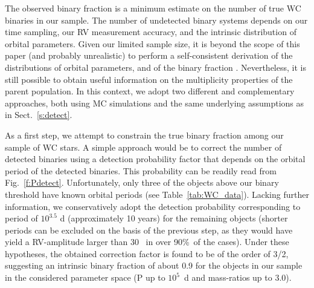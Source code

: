 The observed binary fraction is a minimum estimate on the number of true WC binaries in our sample. The number of undetected binary systems depends on our time sampling, our RV measurement accuracy, and the intrinsic distribution of orbital parameters. Given our limited sample size, it is beyond the scope of this paper (and probably unrealistic) to perform a self-consistent derivation of the distributions of orbital parameters, and of the binary fraction  \citep[as in, e.g., ][]{sana_binary_2012, sana_vlt-flames_2013}. Nevertheless, it is still possible to obtain useful information on the multiplicity properties of the parent population. In this context, we adopt two different and complementary approaches, both using MC simulations and the same underlying assumptions as in Sect.~\ref{s:detect}. 


As a first step, we attempt to constrain the true binary fraction among our sample of WC stars. A simple approach would be to correct the number of detected binaries using a detection probability factor that depends on the orbital period of the detected binaries. This probability can be readily read from Fig.~\ref{f:Pdetect}. Unfortunately, only three of the objects above our binary threshold have known orbital periods (see Table~\ref{tab:WC_data}). Lacking further information, we conservatively adopt the detection probability corresponding to period of $10^{3.5}$ d (approximately 10 years) for the remaining objects (shorter periods can be excluded on the basis of the previous step, as they would have yield a RV-amplitude larger than 30~\kms{} in over 90\%\ of the cases). Under these hypotheses, the obtained correction factor is found to be of the order of 3/2, suggesting an intrinsic binary fraction of about 0.9 for the objects in our sample in the considered parameter space (P up to $10^5$~d and mass-ratios up to 3.0).

